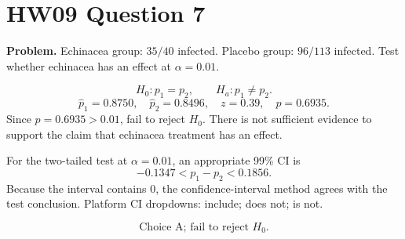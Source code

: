 \documentclass[11pt]{article}
\begin{document}
\section*{HW09 Question 7}

\textbf{Problem.} Echinacea group: \(35/40\) infected. Placebo group: \(96/113\) infected. Test whether echinacea has an effect at \(\alpha=0.01\).

\[
H_0:p_1=p_2,\qquad H_a:p_1\ne p_2.
\]
\[
\hat p_1=0.8750,\quad \hat p_2=0.8496,\quad z=0.39,\quad p=0.6935.
\]
Since \(p=0.6935>0.01\), fail to reject \(H_0\). There is not sufficient evidence to support the claim that echinacea treatment has an effect.

For the two-tailed test at \(\alpha=0.01\), an appropriate 99\% CI is
\[
-0.1347 < p_1-p_2 < 0.1856.
\]
Because the interval contains 0, the confidence-interval method agrees with the test conclusion.
Platform CI dropdowns: include; does not; is not.

\[
\boxed{\text{Choice A; fail to reject }H_0.}
\]
\end{document}

